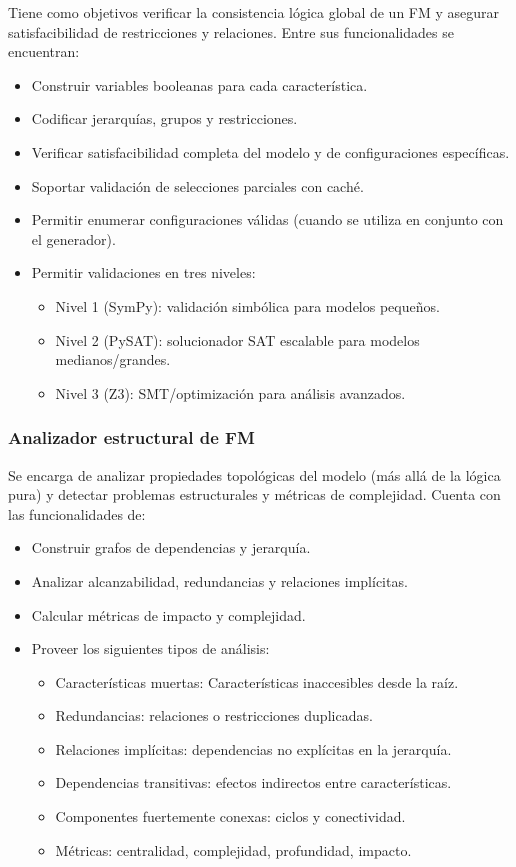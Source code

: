 Tiene como objetivos verificar la consistencia lógica global de un \ac{FM} y
asegurar satisfacibilidad de restricciones y relaciones. Entre sus funcionalidades se encuentran:
\begin{itemize}
	\item Construir variables booleanas para cada característica.
	\item Codificar jerarquías, grupos y restricciones.
	\item Verificar satisfacibilidad completa del modelo y de configuraciones específicas.
	\item Soportar validación de selecciones parciales con caché.
	\item Permitir enumerar configuraciones válidas (cuando se utiliza en conjunto con el generador).
	\item Permitir validaciones en tres niveles:
	\begin{itemize}
		\item Nivel 1 (SymPy): validación simbólica para modelos pequeños.
		\item Nivel 2 (PySAT): solucionador \ac{SAT} escalable para modelos medianos/grandes.
		\item Nivel 3 (Z3): \ac{SMT}/optimización para análisis avanzados.
	\end{itemize}
\end{itemize}

\subsubsection{Analizador estructural de \ac{FM}}

Se encarga de analizar propiedades topológicas del modelo (más allá de la lógica pura) y
detectar problemas estructurales y métricas de complejidad. Cuenta con las funcionalidades de:
\begin{itemize}
	\item Construir grafos de dependencias y jerarquía.
	\item Analizar alcanzabilidad, redundancias y relaciones implícitas.
	\item Calcular métricas de impacto y complejidad.
	\item Proveer los siguientes tipos de análisis:
	\begin{itemize}
		\item Características muertas: Características inaccesibles desde la raíz.
		\item Redundancias: relaciones o restricciones duplicadas.
		\item Relaciones implícitas: dependencias no explícitas en la jerarquía.
		\item Dependencias transitivas: efectos indirectos entre características.
		\item Componentes fuertemente conexas: ciclos y conectividad.
		\item Métricas: centralidad, complejidad, profundidad, impacto.
	\end{itemize}
\end{itemize}

